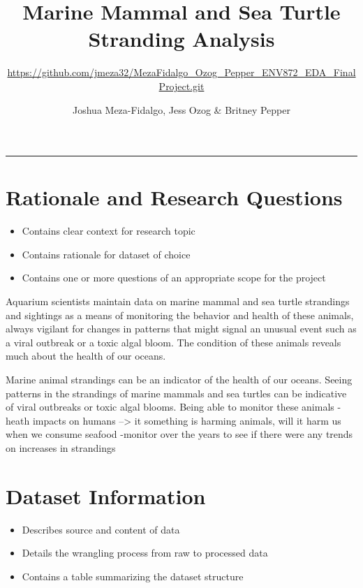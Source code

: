 \documentclass[
  12pt,
]{article}
\title{Marine Mammal and Sea Turtle Stranding Analysis}
\subtitle{\url{https://github.com/jmeza32/MezaFidalgo_Ozog_Pepper_ENV872_EDA_FinalProject.git}}
\author{Joshua Meza-Fidalgo, Jess Ozog \& Britney Pepper}
\date{}
\providecommand{\tightlist}{%
  \setlength{\itemsep}{0pt}\setlength{\parskip}{0pt}}
\begin{document}
\maketitle

\begin{center}\rule{0.5\linewidth}{0.5pt}\end{center}

\newpage
\tableofcontents 
\newpage
\listoftables 
\newpage
\listoffigures 
\newpage

\hypertarget{rationale-and-research-questions}{%
\section{Rationale and Research
Questions}\label{rationale-and-research-questions}}

\begin{itemize}
\tightlist
\item
  Contains clear context for research topic
\item
  Contains rationale for dataset of choice
\item
  Contains one or more questions of an appropriate scope for the project
\end{itemize}

Aquarium scientists maintain data on marine mammal and sea turtle
strandings and sightings as a means of monitoring the behavior and
health of these animals, always vigilant for changes in patterns that
might signal an unusual event such as a viral outbreak or a toxic algal
bloom. The condition of these animals reveals much about the health of
our oceans.

Marine animal strandings can be an indicator of the health of our
oceans. Seeing patterns in the strandings of marine mammals and sea
turtles can be indicative of viral outbreaks or toxic algal blooms.
Being able to monitor these animals -heath impacts on humans
--\textgreater{} it something is harming animals, will it harm us when
we consume seafood -monitor over the years to see if there were any
trends on increases in strandings

\newpage

\hypertarget{dataset-information}{%
\section{Dataset Information}\label{dataset-information}}

\begin{itemize}
\tightlist
\item
  Describes source and content of data
\item
  Details the wrangling process from raw to processed data
\item
  Contains a table summarizing the dataset structure
\end{itemize}
\end{document}
